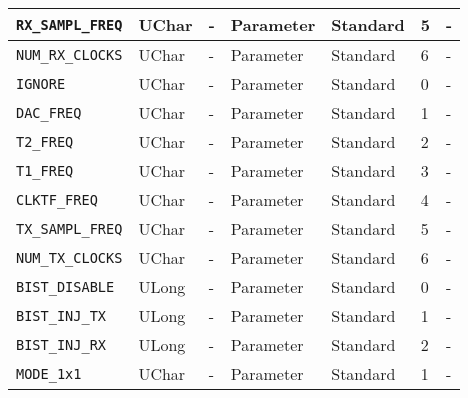 \documentclass{article}
\begin{document}
\begin{landscape}
\begin{scriptsize}
\begin{longtable}{|p{3.6cm}|p{8.1cm}|p{1.4cm}|p{1.3cm}|p{1.4cm}|p{2.5cm}|p{3.6cm}|}
			\hline
      \verb+RX_SAMPL_FREQ+             & UChar        & -               & Parameter             & Standard                         & 5                   & - \\
			\hline
      \verb+NUM_RX_CLOCKS+             & UChar        & -               & Parameter             & Standard                         & 6                   & - \\
			\hline
      \verb+IGNORE+                    & UChar        & -               & Parameter             & Standard                         & 0                   & - \\
			\hline
      \verb+DAC_FREQ+                  & UChar        & -               & Parameter             & Standard                         & 1                   & - \\
			\hline
      \verb+T2_FREQ+                   & UChar        & -               & Parameter             & Standard                         & 2                   & - \\
			\hline
      \verb+T1_FREQ+                   & UChar        & -               & Parameter             & Standard                         & 3                   & - \\
			\hline
      \verb+CLKTF_FREQ+                & UChar        & -               & Parameter             & Standard                         & 4                   & - \\
			\hline
      \verb+TX_SAMPL_FREQ+             & UChar        & -               & Parameter             & Standard                         & 5                   & - \\
			\hline
      \verb+NUM_TX_CLOCKS+             & UChar        & -               & Parameter             & Standard                         & 6                   & - \\
			\hline
      \verb+BIST_DISABLE+              & ULong        & -               & Parameter             & Standard                         & 0                   & - \\
			\hline
      \verb+BIST_INJ_TX+               & ULong        & -               & Parameter             & Standard                         & 1                   & - \\
			\hline
      \verb+BIST_INJ_RX+               & ULong        & -               & Parameter             & Standard                         & 2                   & - \\
			\hline
      \verb+MODE_1x1+                  & UChar        & -               & Parameter             & Standard                         & 1                   & - \\

\end{longtable}
\end{scriptsize}
\end{landscape}
\end{document}
